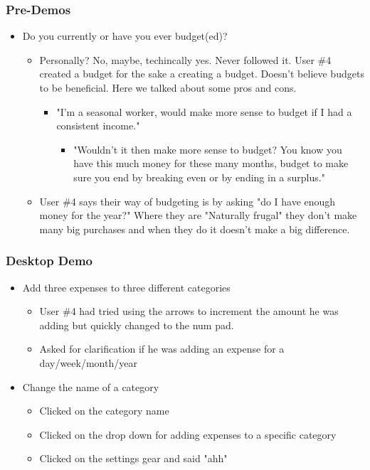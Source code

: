 \documentclass{chi2011}
\begin{document}
	\subsubsection{Pre-Demos}
	\begin{itemize}[noitemsep]
		\item Do you currently or have you ever budget(ed)?
		\begin{itemize}[noitemsep]
			\item 
				Personally? No, maybe, techincally yes. Never followed it. User \#4 created a budget for the
				sake a creating a budget. Doesn't believe budgets to be beneficial. Here we talked about
				some pros and cons.
				\begin{itemize}[noitemsep]
					\item "I'm a seasonal worker, would make more sense to budget if I had a consistent 
					      income."
					\begin{itemize}[noitemsep]
						\item "Wouldn't it then make more sense to budget? You know you have this much 
							   money for these many months, budget to make sure you end by breaking even or
							   by ending in a surplus."
					\end{itemize}
				\end{itemize}
			\item 
				User \#4 says their way of budgeting is by asking "do I have enough money for the year?" 
				Where they are "Naturally frugal" they don't make many big purchases and when they do it 
				doesn't make a big difference. 
		\end{itemize}
	\end{itemize}
	
	\subsubsection{Desktop Demo}
	\begin{itemize}[noitemsep] 
		\item Add three expenses to three different categories
		\begin{itemize}[noitemsep]
			\item User \#4 had tried using the arrows to increment the amount he was adding but quickly 
				  changed to the num pad.
			\item Asked for clarification if he was adding an expense for a day/week/month/year 
		\end{itemize}
		\item Change the name of a category
		\begin{itemize}[noitemsep]
			\item Clicked on the category name
			\item Clicked on the drop down for adding expenses to a specific category
			\item Clicked on the settings gear and said "ahh"
		\end{itemize}
	\end{itemize}
	
\end{document}
